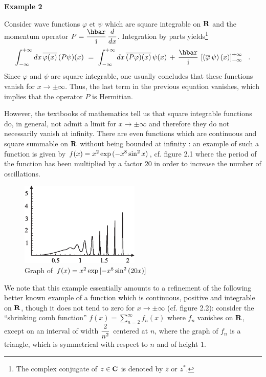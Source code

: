 \documentclass[12pt]{report}
\begin{document}
\bigskip
 

\noindent 
{\bf Example 2}
 
\medskip

Consider wave functions
$\varphi$ et $\psi$ which are square integrable on ${\bf R}$
and the momentum operator $P=
\ds{\hbar \over \ri} \, \ds{d \over dx}$.
Integration by parts yields\footnote{The complex conjugate
of $z \in {\bf C}$ is denoted by $\bar z$ or $z^{\ast}$.} 
\[
\int_{-\infty}^{+\infty} dx \,  \overline{\varphi (x)} \,
(P \psi ) (x ) \ = \
\int_{-\infty}^{+\infty} dx \,
\overline{(P\varphi )(x)} \, \psi (x)   \, + \,
\ds{\hbar \over \ri} \, \left[ \left(
\overline{\varphi} \, \psi \right) (x) \right] _{-\infty}^{+\infty}
\ \ .
\]
Since $\varphi$ and $\psi$ are square integrable, one usually concludes
that these functions
vanish for $x \to \pm \infty$. Thus, the last term in the previous 
equation vanishes, which implies that the operator $P$
is Hermitian. 

However, the  textbooks of mathematics  tell us
that square integrable functions do, in general, not admit a
limit  for $x \to \pm \infty$ and therefore they do not necessarily 
vanish at infinity. 
There are even functions which are continuous and 
square summable
on ${\bf R}$ without being bounded at infinity
\cite{ri}: an example of such a function is given by
$f(x) = x^2 \, {\rm exp}\, (-x^8\, {\rm sin}^2 \, x)$,  
cf. figure 
2.1 where the period of the function has been multiplied 
by a factor $20$ in order to increase the number of 
oscillations. 

\bigskip 

\begin{figure}[h!]
\centerline{\includegraphics*[height=4cm,angle=0]{dessin1.eps}}
\caption{Graph of $f(x) = x^2 \, 
{\rm exp}\, [-x^8\, {\rm sin}^2 \, (20x)]$}
\end{figure}

\bigskip

\noindent We note that this example 
essentially 
amounts to a refinement of the following better known example
\cite{go} of a function which 
is continuous, positive and integrable on ${\bf R}$, 
though it  does not tend to zero for
$x \to \pm \infty$ (cf. figure 2.2): consider the ``shrinking
comb function''
$f(x) = \sum_{n=2}^{\infty} f_n(x)$ where $f_n$ vanishes on
${\bf R}$, except on an interval of width $\displaystyle{2 \over n^2}$
centered at $n$, where the graph of $f_n$ is a triangle, which is
symmetrical with respect to $n$ and of height $1$. 
\end{document}
